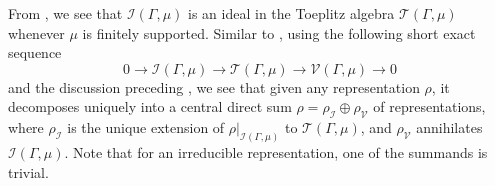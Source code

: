 \documentclass[12pt, class = article, crop = false, a4paper, twoside]{standalone}
\begin{document}
From \cite[Proposition 4.4]{DOAD21}, we see that $\mathcal{I}(\Gamma, \mu)$ is an ideal in the Toeplitz algebra $\mathcal{T}(\Gamma, \mu)$ whenever $\mu$ is finitely supported. Similar to \cite[Section 3]{DOMA17}, using the following short exact sequence 
\begin{equation*}
    0\to \mathcal{I}(\Gamma, \mu) \to \mathcal{T}(\Gamma, \mu) \to \mathcal{V}(\Gamma, \mu) \to 0
\end{equation*}
and the discussion preceding \cite[Theorem 1.3.4]{ARWI76}, we see that given any representation $\rho$, it decomposes uniquely into a central direct sum $\rho = \rho_{\mathcal{I}}\oplus\rho_{\mathcal{V}}$ of representations, where $\rho_{\mathcal{I}}$ is the unique extension of $\rho|_{\mathcal{I}(\Gamma, \mu)}$ to $\mathcal{T}(\Gamma, \mu)$, and $\rho_{\mathcal{V}}$ annihilates $\mathcal{I}(\Gamma, \mu)$. Note that for an irreducible representation, one of the summands is trivial.
\end{document}
